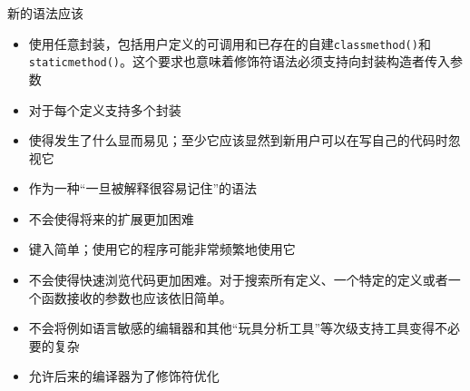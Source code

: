 \documentclass[../main.tex]{subfile}
\begin{document}
新的语法应该
\begin{itemize}
    \item 使用任意封装，包括用户定义的可调用和已存在的自建\lstinline{classmethod()}和\lstinline{staticmethod()}。这个要求也意味着修饰符语法必须支持向封装构造者传入参数
    \item 对于每个定义支持多个封装
    \item 使得发生了什么显而易见；至少它应该显然到新用户可以在写自己的代码时忽视它
    \item 作为一种“一旦被解释很容易记住”的语法
    \item 不会使得将来的扩展更加困难
    \item 键入简单；使用它的程序可能非常频繁地使用它
    \item 不会使得快速浏览代码更加困难。对于搜索所有定义、一个特定的定义或者一个函数接收的参数也应该依旧简单。
    \item 不会将例如语言敏感的编辑器和其他“玩具分析工具”等次级支持工具变得不必要的复杂
    \item 允许后来的编译器为了修饰符优化
\end{itemize}
\end{document}
